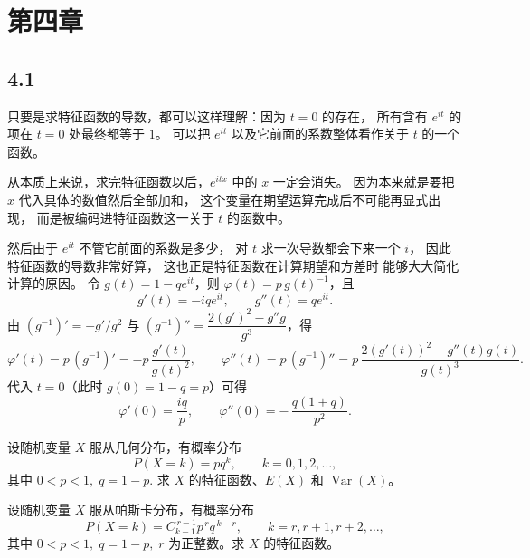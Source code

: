 \section{第四章}
\subsection*{4.1 }
\begin{homework}[4.1]
\begin{dxtips}[]
只要是求特征函数的导数，都可以这样理解：因为 $t=0$ 的存在，
所有含有 $e^{it}$ 的项在 $t=0$ 处最终都等于 $1$。
可以把 $e^{it}$ 以及它前面的系数整体看作关于 $t$ 的一个函数。

从本质上来说，求完特征函数以后，$e^{itx}$ 中的 $x$ 一定会消失。
因为本来就是要把 $x$ 代入具体的数值然后全部加和，
这个变量在期望运算完成后不可能再显式出现，
而是被编码进特征函数这一关于 $t$ 的函数中。

然后由于 $e^{it}$ 不管它前面的系数是多少，
对 $t$ 求一次导数都会下来一个 $i$，
因此特征函数的导数非常好算，
这也正是特征函数在计算期望和方差时
能够大大简化计算的原因。
    令 $g(t)=1-qe^{it}$，则 $\varphi(t)=p\,g(t)^{-1}$，且
\[
g'(t)=-iqe^{it},\qquad g''(t)=qe^{it}.
\]
由 $(g^{-1})'=-g'/g^2$ 与 $(g^{-1})''=\dfrac{2(g')^2-g''g}{g^3}$，得
\[
\varphi'(t)=p\,(g^{-1})'=-p\,\frac{g'(t)}{g(t)^2},
\qquad
\varphi''(t)=p\,(g^{-1})''
=p\,\frac{2(g'(t))^2-g''(t)g(t)}{g(t)^3}.
\]
代入 $t=0$（此时 $g(0)=1-q=p$）可得
\[
\varphi'(0)=\frac{iq}{p},
\qquad
\varphi''(0)=-\,\frac{q(1+q)}{p^2}.
\]
\end{dxtips}
设随机变量 $X$ 服从几何分布，有概率分布
\[
P(X=k)=pq^{k},\qquad k=0,1,2,\ldots,
\]
其中 $0<p<1,\; q=1-p$. 求 $X$ 的特征函数、$E(X)$ 和 $\operatorname{Var}(X)$。
\end{homework}

\begin{homework}[4.2]
设随机变量 $X$ 服从帕斯卡分布，有概率分布
\[
P(X=k)=C_{k-1}^{\,r-1} p^{\,r} q^{\,k-r},\qquad k=r,r+1,r+2,\ldots,
\]
其中 $0<p<1,\; q=1-p,\; r$ 为正整数。求 $X$ 的特征函数。
\end{homework}
